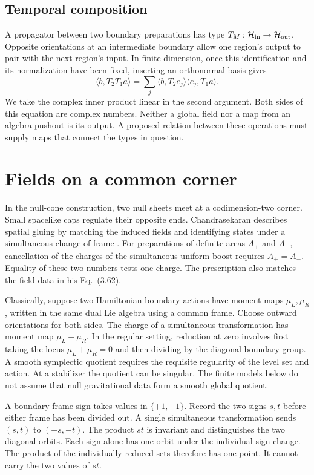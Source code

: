 \documentclass[11pt,letterpaper]{article}
\newcommand{\HH}{\mathcal H}
\begin{document}
\subsection{Temporal composition}
A propagator between two boundary preparations has type
\(T_M:\HH_{\rm in}\to\HH_{\rm out}\). Opposite orientations at an
intermediate boundary allow one region's output to pair with the next
region's input. In finite dimension, once this identification and its
normalization have been fixed, inserting an orthonormal basis gives
\begin{equation}
 \langle b,T_2 T_1 a\rangle
    =\sum_j \langle b,T_2 e_j\rangle\langle e_j,T_1 a\rangle .
 \label{eq:res}
\end{equation}
We take the complex inner product linear in the second argument. Both sides
of this equation are complex numbers. Neither a global field nor a map
from an algebra pushout is its output. A proposed relation between
these operations must supply maps that connect the types in question.

\section{Fields on a common corner}
\label{sec:corner}
In the null-cone construction, two null sheets meet at a codimension-two
corner. Small spacelike caps regulate their opposite ends.
Chandrasekaran describes spatial gluing by matching the induced fields and
identifying states under a simultaneous change of frame
\cite[Secs.~3.6, 4.4]{nc}. For preparations of definite areas \(A_+\) and
\(A_-\), cancellation of the charges of the simultaneous uniform boost
requires \(A_+=A_-\). Equality of these two numbers tests one charge.
The prescription also matches the field data in his Eq.~(3.62).

Classically, suppose two Hamiltonian boundary actions have moment maps
\(\mu_L,\mu_R\), written in the same dual Lie algebra using a common frame.
Choose outward orientations for both sides. The charge of a simultaneous
transformation has moment map \(\mu_L+\mu_R\). In the regular setting,
reduction at zero involves first taking the locus
\(\mu_L+\mu_R=0\) and then dividing by the diagonal boundary group.
A smooth symplectic quotient requires the requisite regularity of the level
set and action. At a stabilizer the quotient can be singular. The finite
models below do not assume that null gravitational data form a smooth
global quotient.

\begin{example}
A boundary frame sign takes values in \(\{+1,-1\}\). Record the two signs
\(s,t\) before either frame has been divided out. A single simultaneous
transformation sends \((s,t)\) to \((-s,-t)\). The product \(st\) is invariant
and distinguishes the two diagonal orbits. Each sign alone has one orbit
under the individual sign change. The product of the individually reduced
sets therefore has one point. It cannot carry the two values of \(st\).
\end{example}
\end{document}
